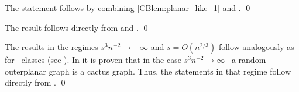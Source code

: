 The statement follows by combining \ref{CBlem:planar_like_1} and . \qed

The result follows directly from  and . \qed

The results in the regimes $s^3n^{-2} \to -\infty$ and $s=O\left(n^{2/3}\right)$ follow analogously as for \pl\ classes (see ). In \cite[Theorem 4]{KangMissethan2020} it is proven that in the case $s^3n^{-2} \to \infty$ \whp\ a random outerplanar graph is a cactus graph. Thus, the statements in that regime follow directly from . \qed

